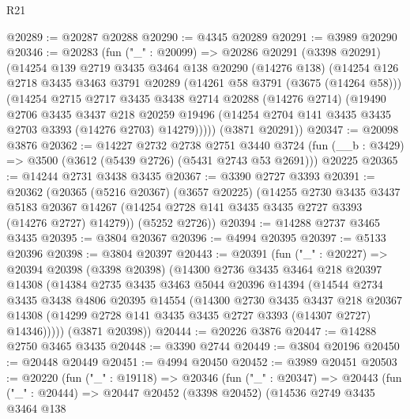 \begin{lexlean}{R21}
\begin{coremodule}
@20289 := @20287 @20288
@20290 := @4345 @20289
@20291 := @3989 @20290
@20346 := @20283
    (fun ("_" : @20099) =>
    @20286
      @20291
      (@3398 @20291)
      (@14254
        @139
        @2719
        @3435
        @3464
        @138
        @20290
        (@14276 @138)
        (@14254
          @126
          @2718
          @3435
          @3463
          @3791
          @20289
          (@14261 @58 @3791 (@3675 (@14264 @58)))
          (@14254
            @2715
            @2717
            @3435
            @3438
            @2714
            @20288
            (@14276 @2714)
            (@19490
              @2706
              @3435
              @3437
              @218
              @20259
              @19496
              (@14254 @2704 @141 @3435 @3435 @2703 @3393 (@14276 @2703) @14279)))))
      (@3871 @20291))
@20347 := @20098 @3876
@20362 := @14227
    @2732
    @2738
    @2751
    @3440
    @3724
    (fun (__b : @3429) => @3500 (@3612 (@5439 @2726) (@5431 @2743 @53 @2691)))
    @20225
@20365 := @14244 @2731 @3438 @3435
@20367 := @3390 @2727 @3393
@20391 := @20362
    (@20365
      (@5216 @20367)
      (@3657 @20225)
      (@14255
        @2730
        @3435
        @3437
        @5183
        @20367
        @14267
        (@14254 @2728 @141 @3435 @3435 @2727 @3393 (@14276 @2727) @14279))
      (@5252 @2726))
@20394 := @14288 @2737 @3465 @3435
@20395 := @3804 @20367
@20396 := @4994 @20395
@20397 := @5133 @20396
@20398 := @3804 @20397
@20443 := @20391
    (fun ("_" : @20227) =>
    @20394
      @20398
      (@3398 @20398)
      (@14300
        @2736
        @3435
        @3464
        @218
        @20397
        @14308
        (@14384
          @2735
          @3435
          @3463
          @5044
          @20396
          @14394
          (@14544
            @2734
            @3435
            @3438
            @4806
            @20395
            @14554
            (@14300
              @2730
              @3435
              @3437
              @218
              @20367
              @14308
              (@14299 @2728 @141 @3435 @3435 @2727 @3393 (@14307 @2727) @14346)))))
      (@3871 @20398))
@20444 := @20226 @3876
@20447 := @14288 @2750 @3465 @3435
@20448 := @3390 @2744
@20449 := @3804 @20196
@20450 := @20448 @20449
@20451 := @4994 @20450
@20452 := @3989 @20451
@20503 := @20220
    (fun ("_" : @19118) =>
    @20346
      (fun ("_" : @20347) =>
      @20443
        (fun ("_" : @20444) =>
        @20447
          @20452
          (@3398 @20452)
          (@14536
            @2749
            @3435
            @3464
            @138

\end{coremodule}
\end{lexlean}
